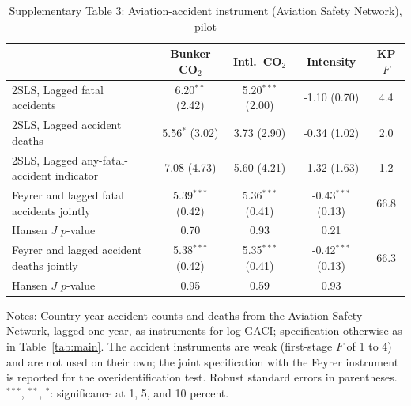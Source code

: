 \documentclass[12pt]{article}
\begin{document}
\begin{table}[htbp]
\centering
\begin{threeparttable}
\caption{Supplementary Table 3: Aviation-accident instrument (Aviation Safety Network), pilot}
\label{tab:accident_iv}
\footnotesize
\begin{tabular}{lcccc}
\toprule
 & Bunker CO$_2$ & Intl.\ CO$_2$ & Intensity & KP $F$ \\
\midrule
  2SLS, Lagged fatal accidents & 6.20$^{**}$ (2.42) & 5.20$^{***}$ (2.00) & -1.10 (0.70) & 4.4 \\
  2SLS, Lagged accident deaths & 5.56$^{*}$ (3.02) & 3.73 (2.90) & -0.34 (1.02) & 2.0 \\
  2SLS, Lagged any-fatal-accident indicator & 7.08 (4.73) & 5.60 (4.21) & -1.32 (1.63) & 1.2 \\
  Feyrer and lagged fatal accidents jointly & 5.39$^{***}$ (0.42) & 5.36$^{***}$ (0.41) & -0.43$^{***}$ (0.13) & 66.8 \\
  \quad Hansen $J$ $p$-value & 0.70 & 0.93 & 0.21 & \\
  Feyrer and lagged accident deaths jointly & 5.38$^{***}$ (0.42) & 5.35$^{***}$ (0.41) & -0.42$^{***}$ (0.13) & 66.3 \\
  \quad Hansen $J$ $p$-value & 0.95 & 0.59 & 0.93 & \\
\bottomrule
\end{tabular}
\begin{tablenotes}[flushleft]
\footnotesize
\item Notes: Country-year accident counts and deaths from the Aviation Safety Network, lagged one year, as instruments for log GACI; specification otherwise as in Table~\ref{tab:main}. The accident instruments are weak (first-stage $F$ of 1 to 4) and are not used on their own; the joint specification with the Feyrer instrument is reported for the overidentification test. Robust standard errors in parentheses. $^{***}$, $^{**}$, $^{*}$: significance at 1, 5, and 10 percent.
\end{tablenotes}
\end{threeparttable}
\end{table}
\end{document}
